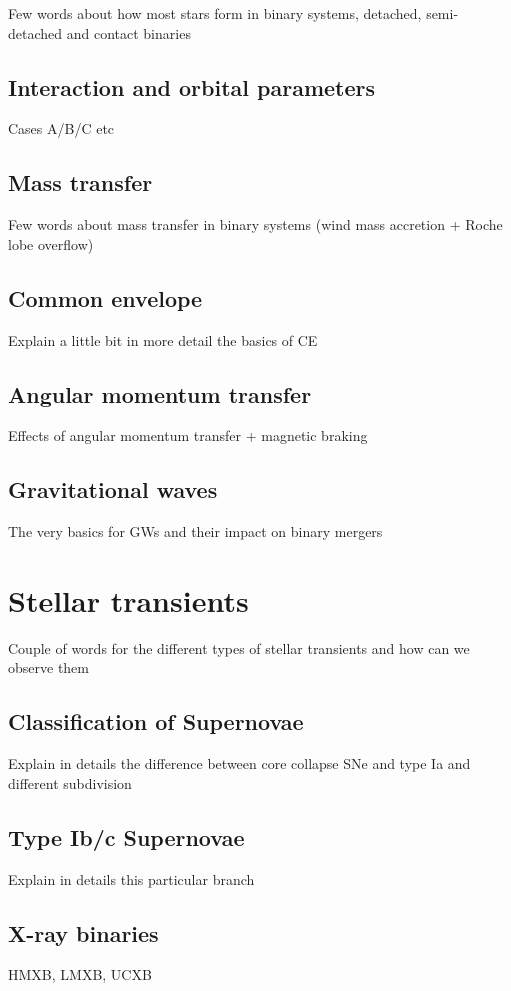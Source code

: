 \documentclass[../../main/thesis_msc.tex]{subfiles}
\begin{document}
		Few words about how most stars form in binary systems, detached, semi-detached and contact binaries
		
			\subsection{Interaction and orbital parameters}
			
				Cases A/B/C etc
				
			\subsection{Mass transfer}
			
				Few words about mass transfer in binary systems (wind mass accretion + Roche lobe overflow)
				
			\subsection{Common envelope}
			
				Explain a little bit in more detail the basics of CE
				
			\subsection{Angular momentum transfer}
			
				Effects of angular momentum transfer + magnetic braking
				
			\subsection{Gravitational waves}
			
				The very basics for GWs and their impact on binary mergers
				
	\section{Stellar transients}
	
		Couple of words for the different types of stellar transients and how can we observe them
		
			\subsection{Classification of Supernovae}
			
				Explain in details the difference between core collapse SNe and type Ia and different subdivision
				
			\subsection{Type Ib/c Supernovae}
			
				Explain in details this particular branch
				
			\subsection{X-ray binaries}
			
				HMXB, LMXB, UCXB
    
    
    
\end{document}
